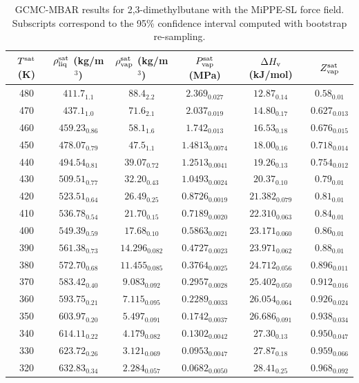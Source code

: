 \documentclass[journal=jctc,manuscript=article]{achemso}
\begin{document}
\begin{table}[htb!]
	\caption{GCMC-MBAR results for 2,3-dimethylbutane with the MiPPE-SL force field. Subscripts correspond to the 95\% confidence interval computed with bootstrap re-sampling.}
	\begin{center}
		\begin{tabular}{|c|c|c|c|c|c|}
			\hline
			$T^{\rm sat}$ (K) & $\rho_{\rm liq}^{\rm sat}$ (kg/m$^3$) & $\rho_{\rm vap}^{\rm sat}$ (kg/m$^3$) & $P_{\rm vap}^{\rm sat}$ (MPa) & $\Delta H_{\rm v}$ (kJ/mol) & $Z_{\rm vap}^{\rm sat}$ \\ \hline
			480 & $411.7_{1.1}$ & $88.4_{2.2}$ & $2.369_{0.027}$ & $12.87_{0.14}$ & $0.58_{0.01}$ \\
			470 & $437.1_{1.0}$ & $71.6_{2.1}$ & $2.037_{0.019}$ & $14.80_{0.17}$ & $0.627_{0.013}$ \\
			460 & $459.23_{0.86}$ & $58.1_{1.6}$ & $1.742_{0.013}$ & $16.53_{0.18}$ & $0.676_{0.015}$ \\
			450 & $478.07_{0.79}$ & $47.5_{1.1}$ & $1.4813_{0.0074}$ & $18.00_{0.16}$ & $0.718_{0.014}$ \\
			440 & $494.54_{0.81}$ & $39.07_{0.72}$ & $1.2513_{0.0041}$ & $19.26_{0.13}$ & $0.754_{0.012}$ \\
			430 & $509.51_{0.77}$ & $32.20_{0.43}$ & $1.0493_{0.0024}$ & $20.37_{0.10}$ & $0.79_{0.01}$ \\
			420 & $523.51_{0.64}$ & $26.49_{0.25}$ & $0.8726_{0.0019}$ & $21.382_{0.079}$ & $0.81_{0.01}$ \\
			410 & $536.78_{0.54}$ & $21.70_{0.15}$ & $0.7189_{0.0020}$ & $22.310_{0.063}$ & $0.84_{0.01}$ \\
			400 & $549.39_{0.59}$ & $17.68_{0.10}$ & $0.5863_{0.0021}$ & $23.171_{0.060}$ & $0.86_{0.01}$ \\
			390 & $561.38_{0.73}$ & $14.296_{0.082}$ & $0.4727_{0.0023}$ & $23.971_{0.062}$ & $0.88_{0.01}$ \\
			380 & $572.70_{0.68}$ & $11.455_{0.085}$ & $0.3764_{0.0025}$ & $24.712_{0.056}$ & $0.896_{0.011}$ \\
			370 & $583.42_{0.40}$ & $9.083_{0.092}$ & $0.2957_{0.0028}$ & $25.402_{0.050}$ & $0.912_{0.016}$ \\
			360 & $593.75_{0.21}$ & $7.115_{0.095}$ & $0.2289_{0.0033}$ & $26.054_{0.064}$ & $0.926_{0.024}$ \\
			350 & $603.97_{0.20}$ & $5.497_{0.091}$ & $0.1742_{0.0037}$ & $26.686_{0.091}$ & $0.938_{0.034}$ \\
			340 & $614.11_{0.22}$ & $4.179_{0.082}$ & $0.1302_{0.0042}$ & $27.30_{0.13}$ & $0.950_{0.047}$ \\
			330 & $623.72_{0.26}$ & $3.121_{0.069}$ & $0.0953_{0.0047}$ & $27.87_{0.18}$ & $0.959_{0.066}$ \\
			320 & $632.83_{0.34}$ & $2.284_{0.057}$ & $0.0682_{0.0050}$ & $28.41_{0.25}$ & $0.968_{0.092}$ \\
			\hline
		\end{tabular}
	\end{center}
\end{table}
\end{document}
